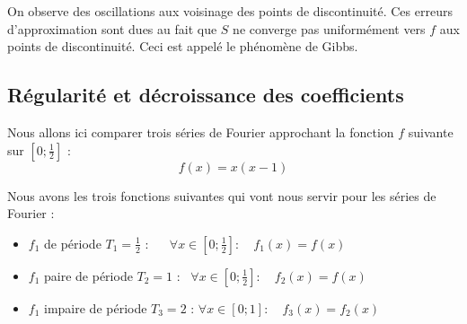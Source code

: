 		On observe des oscillations aux voisinage des points de discontinuité. Ces erreurs d'approximation sont dues au fait que $S$ ne converge pas uniformément vers $f$ aux points de discontinuité.
		Ceci est appelé le phénomène de Gibbs.

	\subsection{Régularité et décroissance des coefficients}

		Nous allons ici comparer trois séries de Fourier approchant la fonction $f$ suivante sur $[0; \frac{1}{2}]$ :
		\begin{equation}
			\label{eq-6-fComp}
			f(x) = x(x-1)
		\end{equation}

		Nous avons les trois fonctions suivantes qui vont nous servir pour les séries de Fourier :
		\begin{itemize}
			\item $f_1$ de période $T_1 = \frac{1}{2}$ : \qquad\qquad\quad~~ $\forall x\in[0;\frac{1}{2}] : \quad f_1(x) = f(x) $	
			\item $f_1$ paire de période $T_2 = 1$ : \qquad\quad\, $\forall x\in[0;\frac{1}{2}] : \quad f_2(x) = f(x) $		
			\item $f_1$ impaire de période $T_3 = 2$ : \qquad $\forall x\in[0;1] : \quad f_3(x) = f_2(x) $	
		\end{itemize}

